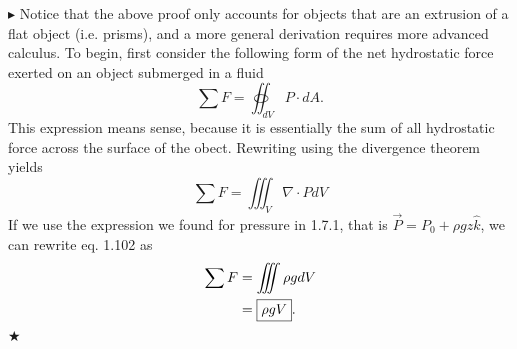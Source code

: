 \noindent\color{Orchid}$\blacktriangleright$ \color{black} Notice that the above proof only accounts for objects that are an extrusion of a flat object (i.e. prisms), and a more general derivation requires more advanced calculus. To begin, first consider the following form of the net hydrostatic force exerted on an object submerged in a fluid
\begin{equation}
    \sum F = \oiint_{dV}P \cdot dA.
\end{equation}
\noindent This expression means sense, because it is essentially the sum of all hydrostatic force across the surface of the obect. Rewriting using the divergence theorem yields
\begin{equation}
    \sum F = \iiint_{V} \nabla \cdot PdV
\end{equation}
\noindent If we use the expression we found for pressure in 1.7.1, that is $\vec{P} = P_0 + \rho g z \hat{k}$, we can rewrite eq. 1.102 as
\begin{align}
    \sum F &= \iiint  \rho g dV \nonumber \\
    &= \boxed{\rho g V}.
\end{align}
\noindent $\bigstar$

